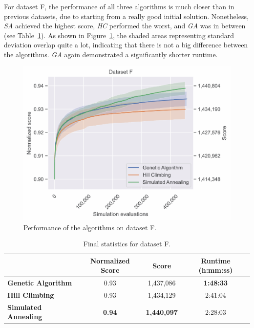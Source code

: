 For dataset F, the performance of all three algorithms is much closer than in previous datasets, due to starting from a really good initial solution. Nonetheless, \textit{SA} achieved the highest score, \textit{HC} performed the worst, and \textit{GA} was in between (see Table~\ref{tab:dataset_f_results}). As shown in Figure~\ref{fig:dataset_f_experiment}, the shaded areas representing standard deviation overlap quite a lot, indicating that there is not a big difference between the algorithms. \textit{GA} again demonstrated a significantly shorter runtime.

\bigskip

\begin{figure}[h]
    \centering
    \includegraphics[width=\linewidth]{img/experiments/pdfa-f_Genetic_Algorithm_Hill_Climbing_Simulated_Annealing.pdf}
    \caption[Performance of the algorithms on dataset F]{
        Performance of the algorithms on dataset F.
    }
    \label{fig:dataset_f_experiment}
\end{figure}

\bigskip

\begin{table}[h]
\centering\footnotesize\sf
\begin{tabular}{lccc}
\toprule
& Normalized Score & Score & Runtime (h:mm:ss) \\
\midrule
\textcolor{myblue}{\textbf{Genetic Algorithm}} & 0.93 & 1,437,086 & \textbf{1:48:33} \\
\textcolor{myorange}{\textbf{Hill Climbing}} & 0.93 & 1,434,129 & 2:41:04 \\
\textcolor{mygreen}{\textbf{Simulated Annealing}} & \textbf{0.94} & \textbf{1,440,097} & 2:28:03 \\
\bottomrule
\end{tabular}
\caption[Statistics for dataset F]{
    Final statistics for dataset F.
}
\label{tab:dataset_f_results}
\end{table}

